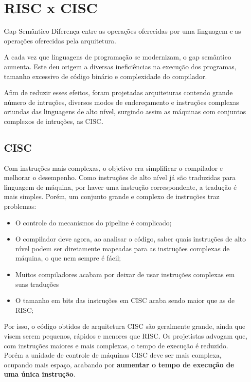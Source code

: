 \chapter{RISC x CISC}

\begin{definicao}{Gap Semântico}
  Diferença entre as operações oferecidas por uma linguagem e as operações oferecidas pela arquitetura.
\end{definicao}

A cada vez que linguagens de programação se modernizam, o gap semântico aumenta. Este deu origem a diversas ineficiências na execução dos programas, tamanho excessivo de código binário e complexidade do compilador.

Afim de reduzir esses efeitos, foram projetadas arquiteturas contendo grande número de intruções, diversos modos de endereçamento e instruções complexas oriundas das linguagens de alto nível, surgindo assim as máquinas com conjuntos complexos de intruções, as CISC.

\section{CISC}
Com instruções mais complexas, o objetivo era simplificar o compilador e melhorar o desempenho. Como instruções de alto nível já são traduzidas para linguagem de máquina, por haver uma instrução correspondente, a tradução é mais simples. Porém, um conjunto grande e complexo de instruções traz problemas:
\begin{itemize}
  \item O controle do mecanismos do pipeline é complicado;

  \item O compilador deve agora, ao analisar o código, saber quais instruções de alto nível podem ser diretamente mapeadas para as instruções complexas de máquina, o que nem sempre é fácil;

  \item Muitos compiladores acabam por deixar de usar instruções complexas em suas traduções

  \item O tamanho em bits das instruções em CISC acaba sendo maior que as de RISC;

\end{itemize}

Por isso, o código obtidos de arquitetura CISC são geralmente grande, ainda que visem serem pequenos, rápidos e menores que RISC. Os projetistas advogam que, com instruções maiores e mais complexas, o tempo de execução é reduzido. Porém a unidade de controle de máquinas CISC deve ser mais complexa, ocupando mais espaço, acabando por \textbf{aumentar o tempo de execução de uma única instrução}.


